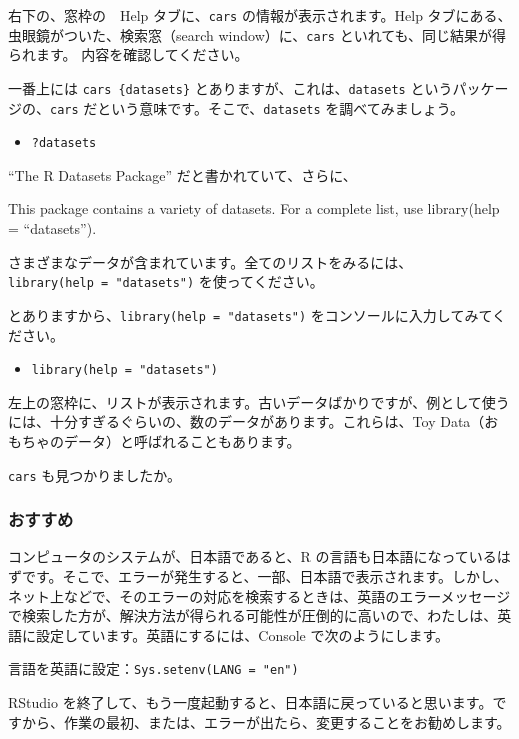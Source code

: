 \documentclass[
]{bxjsbook}
\providecommand{\tightlist}{%
  \setlength{\itemsep}{0pt}\setlength{\parskip}{0pt}}
\theoremstyle{definition}
\theoremstyle{definition}
\theoremstyle{definition}
\theoremstyle{definition}
\theoremstyle{remark}
\begin{document}
右下の、窓枠の　Help タブに、\texttt{cars} の情報が表示されます。Help タブにある、虫眼鏡がついた、検索窓（search window）に、\texttt{cars} といれても、同じ結果が得られます。
内容を確認してください。

一番上には \texttt{cars\ \{datasets\}} とありますが、これは、\texttt{datasets} というパッケージの、\texttt{cars} だという意味です。そこで、\texttt{datasets} を調べてみましょう。

\begin{itemize}
\tightlist
\item
  \texttt{?datasets}
\end{itemize}

``The R Datasets Package'' だと書かれていて、さらに、

This package contains a variety of datasets. For a complete list, use library(help = ``datasets'').

さまざまなデータが含まれています。全てのリストをみるには、\texttt{library(help\ =\ "datasets")} を使ってください。

とありますから、\texttt{library(help\ =\ "datasets")} をコンソールに入力してみてください。

\begin{itemize}
\tightlist
\item
  \texttt{library(help\ =\ "datasets")}
\end{itemize}

左上の窓枠に、リストが表示されます。古いデータばかりですが、例として使うには、十分すぎるぐらいの、数のデータがあります。これらは、Toy Data（おもちゃのデータ）と呼ばれることもあります。

\texttt{cars} も見つかりましたか。

\hypertarget{ux304aux3059ux3059ux3081}{%
\subsubsection{おすすめ}\label{ux304aux3059ux3059ux3081}}

コンピュータのシステムが、日本語であると、R の言語も日本語になっているはずです。そこで、エラーが発生すると、一部、日本語で表示されます。しかし、ネット上などで、そのエラーの対応を検索するときは、英語のエラーメッセージで検索した方が、解決方法が得られる可能性が圧倒的に高いので、わたしは、英語に設定しています。英語にするには、Console で次のようにします。

言語を英語に設定：\texttt{Sys.setenv(LANG\ =\ "en")}

RStudio を終了して、もう一度起動すると、日本語に戻っていると思います。ですから、作業の最初、または、エラーが出たら、変更することをお勧めします。
\end{document}
